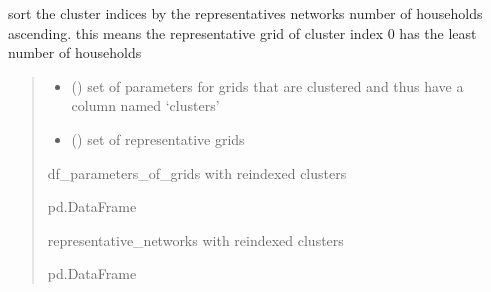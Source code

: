 \documentclass[letterpaper,10pt,english]{sphinxmanual}
\begin{document}
\begin{fulllineitems}
\label{\detokenize{classification/classification_steps/clustering:classification.clustering.clustering_algorithms.reindex_cluster_indices}}
\pysigstartsignatures
{}
\pysigstopsignatures
\sphinxAtStartPar
sort the cluster indices by the representatives networks number of households ascending.
this means the representative grid of cluster index 0 has the least number of households
\begin{quote}\begin{description}
\begin{itemize}
\item {} 
\sphinxAtStartPar
{} () \textendash{} set of parameters for grids that are clustered and thus have a column named ‘clusters’

\item {} 
\sphinxAtStartPar
{} () \textendash{} set of representative grids

\end{itemize}

\sphinxAtStartPar
df\_parameters\_of\_grids with re\sphinxhyphen{}indexed clusters

\sphinxAtStartPar
pd.DataFrame

\sphinxAtStartPar
representative\_networks with re\sphinxhyphen{}indexed clusters

\sphinxAtStartPar
pd.DataFrame

\end{description}\end{quote}

\end{fulllineitems}
\end{document}
